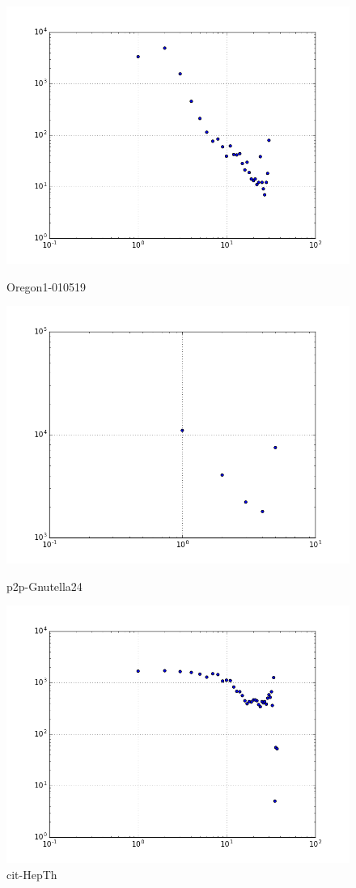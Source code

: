 \begin{figure}[H]
  \includegraphics[width=\linewidth]{img/oregon-010519/kcore_dist.png}
  \caption*{Oregon1-010519}
\endminipage\hfill
{}
  \includegraphics[width=\linewidth]{img/p2p-Gnutella24/kcore_dist.png}
  \caption*{p2p-Gnutella24}
\endminipage\hfill
{}
  \includegraphics[width=\linewidth]{img/cit-HepTh/kcore_dist.png}
  \caption*{cit-HepTh}
\endminipage
\end{figure}

